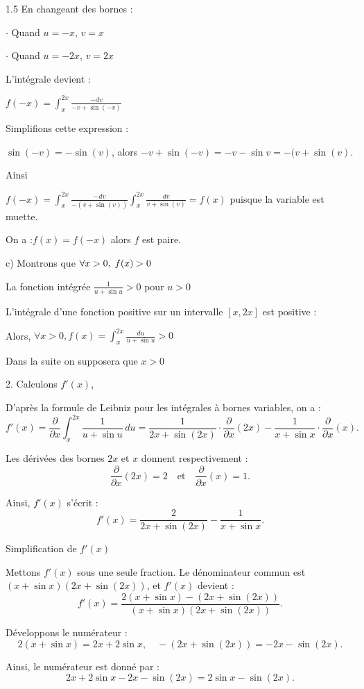 \documentclass[12pt]{article}
\begin{document}
\begin{spacing}{1.5}
 En changeant des bornes :
 
$ \cdot$ Quand $u=-x$, $v=x$
 
$ \cdot$ Quand $u=-2x$, $v=2x$
 
 L'intégrale devient :
 
 $f(-x)=\int_{x}^{2x}\frac{-dv}{-v+\sin(-v)}$
 
 Simplifions cette expression :
 
 $\sin(-v)=-\sin(v)$, alors $-v+\sin(-v)=-v-\sin v=-(v+\sin(v)$.
 
 Ainsi 

 $f(-x)=\int_{x}^{2x}\frac{-dv}{-(v+\sin(v))}\int_{x}^{2x}\frac{dv}{v+\sin(v)}=f(x)$ puisque la variable est muette.
 
 On a :$f(x)=f(-x)$ alors $f$ est paire.
 
 c) Montrons que $\forall x>0, \hspace{0.1cm}f(x)>0$
 
 La fonction intégrée $\frac{1}{u+\sin u}>0$ pour $u>0$
 
 L'intégrale d'une fonction positive sur un intervalle $[x,2x]$ est positive :
 
 Alors, $\forall x>0, f(x)=\int_{x}^{2x}\frac{du}{u+\sin u}>0$
 
 Dans la suite on supposera que $x>0$
 
 2. Calculons $f'(x)$, 
 
 D'après la formule de Leibniz pour les intégrales à bornes variables, on a :
\[
f'(x) = \frac{\partial}{\partial x} \int_x^{2x} \frac{1}{u + \sin u} \, du = \frac{1}{2x + \sin(2x)} \cdot \frac{\partial}{\partial x}(2x) - \frac{1}{x + \sin x} \cdot \frac{\partial}{\partial x}(x).
\]

Les dérivées des bornes \( 2x \) et \( x \) donnent respectivement :
\[
\frac{\partial}{\partial x}(2x) = 2 \quad \text{et} \quad \frac{\partial}{\partial x}(x) = 1.
\]

Ainsi, \( f'(x) \) s'écrit :
\[
f'(x) = \frac{2}{2x + \sin(2x)} - \frac{1}{x + \sin x}.
\]

 Simplification de \( f'(x) \)

Mettons \( f'(x) \) sous une seule fraction. Le dénominateur commun est \((x + \sin x)(2x + \sin(2x))\), et \( f'(x) \) devient :
\[
f'(x) = \frac{2(x + \sin x) - (2x + \sin(2x))}{(x + \sin x)(2x + \sin(2x))}.
\]

Développons le numérateur :
\[
2(x + \sin x) = 2x + 2\sin x, \quad -(2x + \sin(2x)) = -2x - \sin(2x).
\]

Ainsi, le numérateur est donné par :
\[
2x + 2\sin x - 2x - \sin(2x) = 2\sin x - \sin(2x).
\]


\end{spacing}
\end{document}
